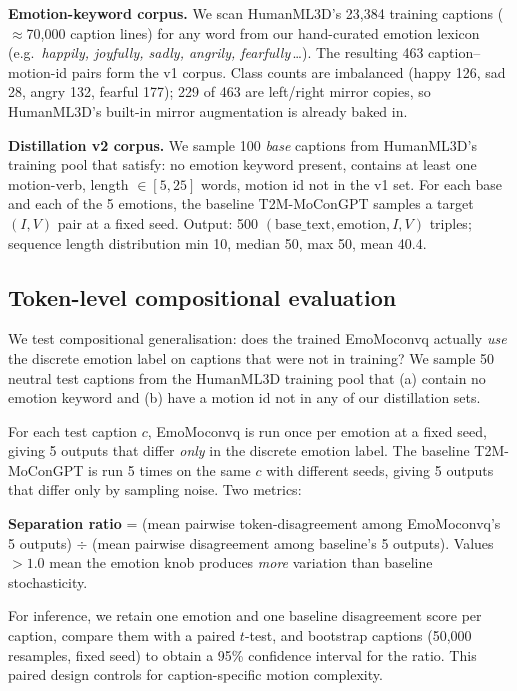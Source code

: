 \documentclass[conference]{IEEEtran}
\begin{document}
\textbf{Emotion-keyword corpus.} We scan HumanML3D's 23{,}384 training
captions ($\approx$70{,}000 caption lines) for any word from our
hand-curated emotion lexicon (e.g.\ \textit{happily, joyfully, sadly,
angrily, fearfully}\,\ldots). The resulting 463 caption--motion-id pairs
form the v1 corpus. Class counts are imbalanced (happy 126, sad 28,
angry 132, fearful 177); 229 of 463 are left/right mirror copies, so
HumanML3D's built-in mirror augmentation is already baked in.

\textbf{Distillation v2 corpus.} We sample 100 \emph{base} captions
from HumanML3D's training pool that satisfy: no emotion keyword present,
contains at least one motion-verb, length $\in [5, 25]$ words, motion id
not in the v1 set. For each base and each of the 5 emotions, the baseline
T2M-MoConGPT samples a target $(I, V)$ pair at a fixed seed. Output: 500
$(\text{base\_text}, \text{emotion}, I, V)$ triples; sequence length
distribution min 10, median 50, max 50, mean 40.4.

\subsection{Token-level compositional evaluation}
\label{sec:tokeneval}
We test compositional generalisation: does the trained EmoMoconvq actually
\emph{use} the discrete emotion label on captions that were not in
training? We sample 50 neutral test captions from the HumanML3D training
pool that (a) contain no emotion keyword and (b) have a motion id not in
any of our distillation sets.

For each test caption $c$, EmoMoconvq is run once per emotion at a fixed
seed, giving 5 outputs that differ \emph{only} in the discrete emotion
label. The baseline T2M-MoConGPT is run 5 times on the same $c$ with
different seeds, giving 5 outputs that differ only by sampling noise.
Two metrics:

\textbf{Separation ratio} = (mean pairwise token-disagreement among
EmoMoconvq's 5 outputs) $\div$ (mean pairwise disagreement among
baseline's 5 outputs). Values $>1.0$ mean the emotion knob produces
\emph{more} variation than baseline stochasticity.

For inference, we retain one emotion and one baseline disagreement score per
caption, compare them with a paired $t$-test, and bootstrap captions (50{,}000
resamples, fixed seed) to obtain a 95\% confidence interval for the ratio.
This paired design controls for caption-specific motion complexity.
\end{document}
